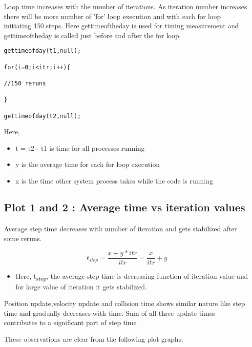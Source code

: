 \documentclass[11pt]{article}
\begin{document}
	Loop time increases with the number of iterations. As iteration number increases there will be more
	 number of 'for' loop execution and with each for loop initiating 150 steps. 
	Here gettimeoftheday is used for timing measurement and gettimeoftheday is called just before and after the for loop.

\begin{lstlisting}
gettimeofday(t1,null);

for(i=0;i<itr;i++){

//150 reruns

}

gettimeofday(t2,null);

\end{lstlisting}

Here, 	
\begin{itemize}
\item t = t2 - t1 is time for all processes running
\item y is the average time for each for loop execution
\item x is the time other system process takes while the code is running
\end{itemize}

\subsection{Plot 1 and 2 : Average time vs iteration values}
\paragraph{}
Average step time decreases with number of iteration and gets stabilized 
after some reruns.

\begin{equation}
	t_{step} = \frac {x+y*itr} {itr} = \frac {x} {itr} + y
\end{equation}


\begin{itemize}
\item Here, t\textsubscript{step}, the average step time is decreasing function of iteration value and for 
large value of iteration it gets stabilized.
\end{itemize}

Position update,velocity update and collision time shows similar nature like step time and gradually decreases with time.
Sum of all three update times contributes to a significant part of step time

These observations are clear from the following plot graphs:
\end{document}
